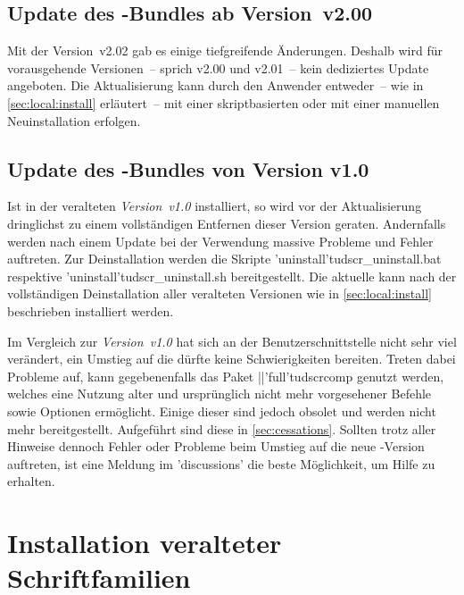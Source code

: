 \subsection{Update des \TUDScript-Bundles ab Version~v2.00}

Mit der Version~v2.02 gab es einige tiefgreifende Änderungen. Deshalb wird für 
vorausgehende Versionen~-- sprich v2.00 und v2.01~-- kein dediziertes Update 
angeboten. Die Aktualisierung kann durch den Anwender entweder~-- wie in 
\autoref{sec:local:install} erläutert~-- mit einer skriptbasierten oder mit 
einer manuellen Neuinstallation erfolgen.%
%



\subsection{Update des \TUDScript-Bundles von Version v1.0}

Ist \TUDScript in der veralteten \emph{Version~v1.0} installiert, so wird vor 
der Aktualisierung dringlichst zu einem vollständigen Entfernen dieser Version 
geraten. Andernfalls werden nach einem Update bei der Verwendung massive 
Probleme und Fehler auftreten. Zur Deinstallation werden die Skripte 
\GitHubFile*'uninstall'{tudscr_uninstall.bat} respektive
\GitHubFile*'uninstall'{tudscr_uninstall.sh} bereitgestellt. Die aktuelle 
 kann nach der vollständigen Deinstallation aller 
veralteten Versionen wie in \autoref{sec:local:install} beschrieben installiert 
werden.

Im Vergleich zur \emph{Version~v1.0} hat sich an der Benutzerschnittstelle 
nicht sehr viel verändert, ein Umstieg auf die  dürfte 
keine Schwierigkeiten bereiten. Treten dabei Probleme auf, kann gegebenenfalls 
das Paket \Package||'full'{tudscrcomp} genutzt werden, welches eine Nutzung 
alter und ursprünglich nicht mehr vorgesehener Befehle sowie Optionen 
ermöglicht. Einige dieser sind jedoch obsolet und werden nicht mehr 
bereitgestellt. Aufgeführt sind diese in \autoref{sec:cessations}. Sollten 
trotz aller Hinweise dennoch Fehler oder Probleme beim Umstieg auf die neue 
\TUDScript-Version auftreten, ist eine Meldung im \GitHubRepo'discussions' die 
beste Möglichkeit, um Hilfe zu erhalten.



\section{%
  Installation veralteter Schriftfamilien%
  \label{sec:install:fonts}%
}

